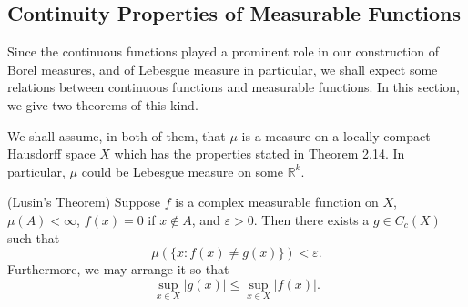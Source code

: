 \subsection{Continuity Properties of Measurable Functions}
Since the continuous functions played a prominent role in our construction of Borel measures, and of Lebesgue measure in particular, we shall expect some relations between continuous functions and measurable functions. In this section, we give two theorems of this kind.\par
We shall assume, in both of them, that $\mu$ is a measure on a locally compact Hausdorff space $X$ which has the properties stated in Theorem 2.14. In particular, $\mu$ could be Lebesgue measure on some $\mathbb{R}^k$.
\begin{theorem}(Lusin's Theorem)
Suppose $f$ is a complex measurable function on $X$, $\mu(A)<\infty$, $f(x)=0$ if $x\notin A$, and $\varepsilon>0$. Then there exists a $g\in C_c(X)$ such that 
$$\mu(\{x:f(x)\ne g(x)\})<\varepsilon.$$
Furthermore, we may arrange it so that 
$$\sup_{x\in X}|g(x)|\le\sup_{x\in X}|f(x)|.$$
\end{theorem}
